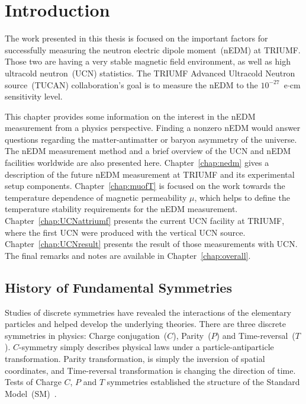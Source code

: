 \chapter{Introduction\label{chap:intro}}
\renewcommand{\thepage}{\arabic{page}}%
\setcounter{page}{1}%


The work presented in this thesis is focused on the important factors
for successfully measuring the neutron electric dipole moment~(nEDM)
at TRIUMF. Those two are having a very stable magnetic field
environment, as well as high ultracold neutron~(UCN) statistics. The
TRIUMF Advanced Ultracold Neutron source~(TUCAN) collaboration's goal
is to measure the nEDM to the $10^{-27}$~e$\cdot$cm sensitivity level.


This chapter provides some information on the interest in the nEDM
measurement from a physics perspective. Finding a nonzero nEDM would
answer questions regarding the matter-antimatter or baryon asymmetry
of the universe. The nEDM measurement method and a brief overview of
the UCN and nEDM facilities worldwide are also presented here.
Chapter~\ref{chap:nedm} gives a description of the future nEDM
measurement at TRIUMF and its experimental setup
components. Chapter~\ref{chap:muofT} is focused on the work towards
the temperature dependence of magnetic permeability $\mu$, which helps
to define the temperature stability requirements for the nEDM
measurement. Chapter~\ref{chap:UCNattriumf} presents the current UCN
facility at TRIUMF, where the first UCN were produced with the
vertical UCN source. Chapter~\ref{chap:UCNresult} presents the result
of those measurements with UCN. The final remarks and notes are
available in Chapter~\ref{chap:overall}.



\section{History of Fundamental Symmetries }

Studies of discrete symmetries have revealed the interactions of the
elementary particles and helped develop the underlying theories.
There are three discrete symmetries in physics: Charge
conjugation~($C$), Parity~($P$) and Time-reversal~($T$). $C$-symmetry
simply describes physical laws under a particle-antiparticle
transformation. Parity transformation, is simply the inversion of
spatial coordinates, and Time-reversal transformation is changing the
direction of time.  Tests of Charge $C$, $P$ and $T$ symmetries
established the structure of the Standard
Model~(SM)~\cite{pospelov2005electric}.

